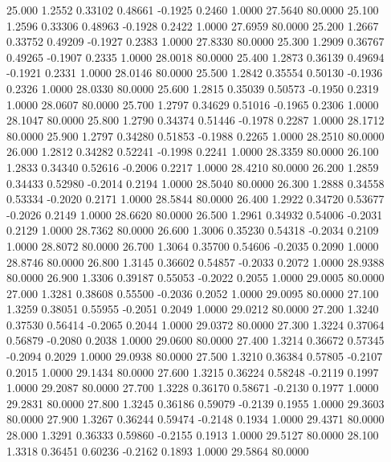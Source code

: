   25.000   1.2552   0.33102   0.48661  -0.1925   0.2460   1.0000  27.5640  80.0000
  25.100   1.2596   0.33306   0.48963  -0.1928   0.2422   1.0000  27.6959  80.0000
  25.200   1.2667   0.33752   0.49209  -0.1927   0.2383   1.0000  27.8330  80.0000
  25.300   1.2909   0.36767   0.49265  -0.1907   0.2335   1.0000  28.0018  80.0000
  25.400   1.2873   0.36139   0.49694  -0.1921   0.2331   1.0000  28.0146  80.0000
  25.500   1.2842   0.35554   0.50130  -0.1936   0.2326   1.0000  28.0330  80.0000
  25.600   1.2815   0.35039   0.50573  -0.1950   0.2319   1.0000  28.0607  80.0000
  25.700   1.2797   0.34629   0.51016  -0.1965   0.2306   1.0000  28.1047  80.0000
  25.800   1.2790   0.34374   0.51446  -0.1978   0.2287   1.0000  28.1712  80.0000
  25.900   1.2797   0.34280   0.51853  -0.1988   0.2265   1.0000  28.2510  80.0000
  26.000   1.2812   0.34282   0.52241  -0.1998   0.2241   1.0000  28.3359  80.0000
  26.100   1.2833   0.34340   0.52616  -0.2006   0.2217   1.0000  28.4210  80.0000
  26.200   1.2859   0.34433   0.52980  -0.2014   0.2194   1.0000  28.5040  80.0000
  26.300   1.2888   0.34558   0.53334  -0.2020   0.2171   1.0000  28.5844  80.0000
  26.400   1.2922   0.34720   0.53677  -0.2026   0.2149   1.0000  28.6620  80.0000
  26.500   1.2961   0.34932   0.54006  -0.2031   0.2129   1.0000  28.7362  80.0000
  26.600   1.3006   0.35230   0.54318  -0.2034   0.2109   1.0000  28.8072  80.0000
  26.700   1.3064   0.35700   0.54606  -0.2035   0.2090   1.0000  28.8746  80.0000
  26.800   1.3145   0.36602   0.54857  -0.2033   0.2072   1.0000  28.9388  80.0000
  26.900   1.3306   0.39187   0.55053  -0.2022   0.2055   1.0000  29.0005  80.0000
  27.000   1.3281   0.38608   0.55500  -0.2036   0.2052   1.0000  29.0095  80.0000
  27.100   1.3259   0.38051   0.55955  -0.2051   0.2049   1.0000  29.0212  80.0000
  27.200   1.3240   0.37530   0.56414  -0.2065   0.2044   1.0000  29.0372  80.0000
  27.300   1.3224   0.37064   0.56879  -0.2080   0.2038   1.0000  29.0600  80.0000
  27.400   1.3214   0.36672   0.57345  -0.2094   0.2029   1.0000  29.0938  80.0000
  27.500   1.3210   0.36384   0.57805  -0.2107   0.2015   1.0000  29.1434  80.0000
  27.600   1.3215   0.36224   0.58248  -0.2119   0.1997   1.0000  29.2087  80.0000
  27.700   1.3228   0.36170   0.58671  -0.2130   0.1977   1.0000  29.2831  80.0000
  27.800   1.3245   0.36186   0.59079  -0.2139   0.1955   1.0000  29.3603  80.0000
  27.900   1.3267   0.36244   0.59474  -0.2148   0.1934   1.0000  29.4371  80.0000
  28.000   1.3291   0.36333   0.59860  -0.2155   0.1913   1.0000  29.5127  80.0000
  28.100   1.3318   0.36451   0.60236  -0.2162   0.1893   1.0000  29.5864  80.0000
